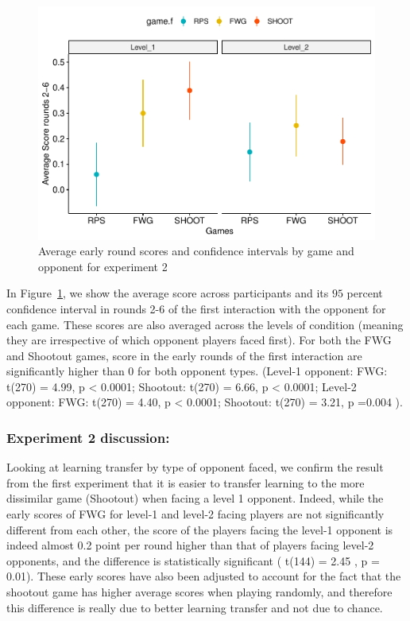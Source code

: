 \documentclass[man,floatsintext]{apa6}
\begin{document}
\begin{figure}

{\centering \includegraphics{draft_report_v3_files/figure-latex/exp2-early-scores-1} 

}

\caption{Average early round scores and confidence intervals by game and opponent for experiment 2}\label{fig:exp2-early-scores}
\end{figure}

In Figure~\ref{fig:exp2-early-scores}, we show the average score across participants and its \(95\) percent confidence interval in rounds 2-6 of the first interaction with the opponent for each game. These scores are also averaged across the levels of condition (meaning they are irrespective of which opponent players faced first). For both the FWG and Shootout games, score in the early rounds of the first interaction are significantly higher than 0 for both opponent types. (Level-1 opponent: FWG: t(270) = 4.99, p \textless{} 0.0001; Shootout: t(270) = 6.66, p \textless{} 0.0001; Level-2 opponent: FWG: t(270) = 4.40, p \textless{} 0.0001; Shootout: t(270) = 3.21, p =0.004 ).

\hypertarget{experiment-2-discussion}{%
\subsubsection{Experiment 2 discussion:}\label{experiment-2-discussion}}

Looking at learning transfer by type of opponent faced, we confirm the result from the first experiment that it is easier to transfer learning to the more dissimilar game (Shootout) when facing a level 1 opponent. Indeed, while the early scores of FWG for level-1 and level-2 facing players are not significantly different from each other, the score of the players facing the level-1 opponent is indeed almost 0.2 point per round higher than that of players facing level-2 opponents, and the difference is statistically significant ( t(144) = 2.45 , p = 0.01). These early scores have also been adjusted to account for the fact that the shootout game has higher average scores when playing randomly, and therefore this difference is really due to better learning transfer and not due to chance.
\end{document}
